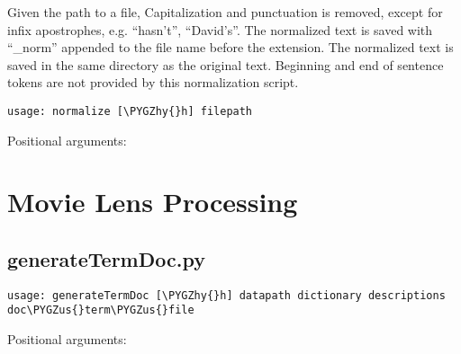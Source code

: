 \documentclass[letterpaper,10pt,english]{sphinxmanual}
\def\PYGZus{\char`\_}
\def\PYGZhy{\char`\-}
\begin{document}
Given the path to a file, Capitalization and punctuation is removed, except for infix apostrophes, e.g. ``hasn't'', ``David's''. The normalized text is saved with ``\_norm'' appended to the file name before the extension. The normalized text is saved in the same directory as the original text. Beginning and end of sentence tokens are not provided by this normalization script.


\begin{Verbatim}[commandchars=\\\{\}]
usage: normalize [\PYGZhy{}h] filepath
\end{Verbatim}
\begin{description}
\item[{Positional arguments:}] \leavevmode{}

\end{description}


\section{Movie Lens Processing}
\label{command_line:movie-lens-processing}

\subsection{generateTermDoc.py}
\label{command_line:generatetermdoc-py}
\begin{Verbatim}[commandchars=\\\{\}]
usage: generateTermDoc [\PYGZhy{}h] datapath dictionary descriptions doc\PYGZus{}term\PYGZus{}file
\end{Verbatim}
\begin{description}
\item[{Positional arguments:}] \leavevmode{}

\end{description}
\end{document}
